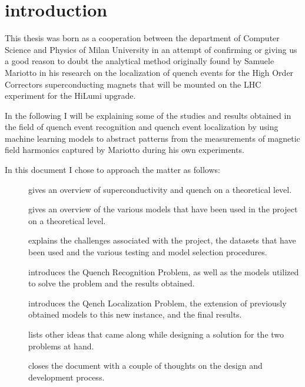 \chapter{introduction}
This thesis was born as a cooperation between the department of Computer Science and Physics of
Milan University in an attempt of confirming or giving us a good reason to doubt the analytical
method originally found by Samuele Mariotto in his research on the localization of quench events for
the High Order Correctors superconducting magnets that will be mounted on the LHC experiment for the
HiLumi upgrade.

In the following I will be explaining some of the studies and results obtained in the field of
quench event recognition and quench event localization by using machine learning models to abstract
patterns from the measurements of magnetic field harmonics captured by Mariotto during his own
experiments.

In this document I chose to approach the matter as follows:
\begin{description}
	\item[] gives an overview of superconductivity and quench on a
		theoretical level.
	\item[] gives an overview of the various models that have been used in the
		project on a theoretical level.
	\item[] explains the challenges associated with the project, the datasets
		that have been used and the various testing and model selection procedures.
	\item[] introduces the Quench Recognition Problem, as well as the models
		utilized to solve the problem and the results obtained.
	\item[] introduces the Qench Localization Problem, the extension of previously
		obtained models to this new instance, and the final results.
	\item[] lists other ideas that came along while designing a solution for
		the two problems at hand.
	\item[] closes the document with a couple of thoughts on the design and
		development process.
\end{description}
